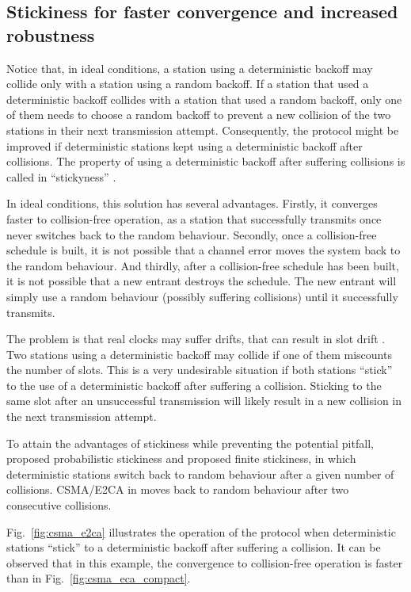\documentclass[journal]{IEEEtran}
\begin{document}
\subsection{Stickiness for faster convergence and increased robustness}

Notice that, in ideal conditions, a station using a deterministic backoff may collide only with a station using a random backoff.
If a station that used a deterministic backoff collides with a station that used a random backoff, only one of them needs to choose a random backoff to prevent a new collision of the two stations in their next transmission attempt.
Consequently, the protocol might be improved if deterministic stations kept using a deterministic backoff after collisions.
The property of using a deterministic backoff after suffering collisions is called in ``stickyness'' \cite{fang2011dlm}.

In ideal conditions, this solution has several advantages.
Firstly, it converges faster to collision-free operation, as a station that successfully transmits once never switches back to the random behaviour.
Secondly, once a collision-free schedule is built, it is not possible that a channel error moves the system back to the random behaviour.
And thirdly, after a collision-free schedule has been built, it is not possible that a new entrant destroys the schedule.
The new entrant will simply use a random behaviour (possibly suffering collisions) until it successfully transmits.

The problem is that real clocks may suffer drifts, that can result in slot drift \cite{gong2012asd}.
Two stations using a deterministic backoff may collide if one of them miscounts the number of slots.
This is a very undesirable situation if both stations ``stick'' to the use of a deterministic backoff after suffering a collision.
Sticking to the same slot after an unsuccessful transmission will likely result in a new collision in the next transmission attempt.

To attain the advantages of stickiness while preventing the potential pitfall, \cite{fang2011dlm} proposed probabilistic stickiness and \cite{barcelo2011tcf} proposed finite stickiness, in which deterministic stations switch back to random behaviour after a given number of collisions.
CSMA/E2CA in \cite{barcelo2011tcf} moves back to random behaviour after two consecutive collisions.

Fig.~\ref{fig:csma_e2ca} illustrates the operation of the protocol when deterministic stations ``stick'' to a deterministic backoff after suffering a collision.
It can be observed that in this example, the convergence to collision-free operation is faster than in Fig.~\ref{fig:csma_eca_compact}.
\end{document}
